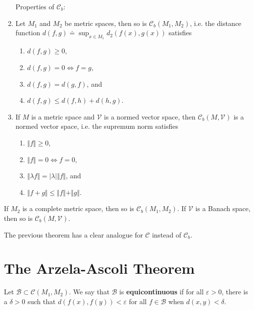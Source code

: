 \documentclass[twoside,10pt]{report}
\begin{document}
\begin{thrm}[]
\begin{enumerate}
	Properties of $\mathcal{C}_{b}$:
	\item Let $M_1$ and $M_2$ be metric spaces, then so is $\mathcal{C}_b(M_1,M_2)$, i.e. the distance function $d(f,g) \doteq \sup_{x\in M_1} d_2(f(x), g(x))$ satisfies
		\begin{enumerate}
			\item $d(f,g) \geq 0$,
			\item $d(f,g) = 0 \iff f=g$,
			\item $d(f,g) = d(g,f)$, and
			\item $d(f,g) \leq d(f,h) + d(h,g)$.
		\end{enumerate}

	\item If $M$ is a metric space and $\mathcal{V}$ is a normed vector space, then $\mathcal{C}_b(M,\mathcal{V})$ is a normed vector space, i.e. the supremum norm satisfies
		\begin{enumerate}
			\item $\Vert{f}\Vert\geq 0$,
			\item $\Vert{f}\Vert=0 \iff f=0$,
			\item $\Vert{\lambda f}\Vert = |\lambda| \Vert{f}\Vert$, and
			\item $\Vert{f+g}\Vert\leq \Vert{f}\Vert+\Vert{g}\Vert$.
		\end{enumerate}
\end{enumerate}
\end{thrm}

\begin{thrm}[]
	If $M_2$ is a complete metric space, then so is $\mathcal{C}_b(M_1,M_2)$. If $\mathcal{V}$ is a Banach space, then so is $\mathcal{C}_b(M, \mathcal{V})$.
\end{thrm}

\begin{note}{}{}
The previous theorem has a clear analogue for $\mathcal{C}$ instead of $\mathcal{C}_b$.
\end{note}


\section{The Arzela-Ascoli Theorem}

\begin{defn}[]
	Let $\mathcal{B} \subset \mathcal{C}(M_1, M_2)$. We say that $\mathcal{B}$ is \textbf{equicontinuous} if for all $\varepsilon>0$, there is a $\delta>0$ such that $d(f(x), f(y)) < \varepsilon$ for all $f \in \mathcal{B}$ when $d(x,y) < \delta$.
\end{defn}
\end{document}
